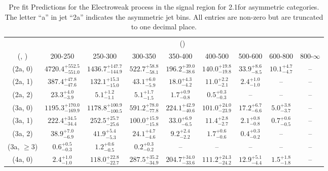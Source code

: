 \begin{table}[h!]
\tiny
\centering
\caption{Pre fit Predictions for the Electroweak process in the signal region for 2.1\ifb for asymmetric categories. The letter ``a'' in jet \eg ``2a''  indicates the asymmetric jet bins. All entries are non-zero but are truncated to one decimal place.\label{tab:predsepnaive_sig_ewk_asym}}
\begin{tabular}
{ccccccccc}
	\hline\hline
	& \multicolumn{8}{c}{\scalht (\gev)} \\ 
	 (\njet,  \nb) & 200-250 & 250-300 & 300-350 & 350-400 & 400-500 & 500-600 & 600-800 & 800-$\infty$ \\ [0.8ex] 
\hline
	(2a, 0) & $4720.4^{+ 552.5 }_{- 551.0 }$ & $1436.7^{+ 147.7 }_{- 144.9 }$ & $522.7^{+ 58.8 }_{- 58.1 }$ & $196.2^{+ 39.0 }_{- 38.6 }$ & $140.0^{+ 19.8 }_{- 19.8 }$ & $33.9^{+ 8.6 }_{- 8.5 }$ & $10.1^{+ 4.7 }_{- 4.7 }$ & -- \\[0.5ex] 
	(2a, 1) & $387.4^{+ 47.8 }_{- 47.6 }$ & $132.1^{+ 15.3 }_{- 15.0 }$ & $43.1^{+ 6.0 }_{- 5.9 }$ & $18.0^{+ 4.3 }_{- 4.2 }$ & $11.0^{+ 2.2 }_{- 2.1 }$ & $2.4^{+ 1.0 }_{- 1.0 }$ & -- & -- \\[0.5ex] 
	(2a, 2) & $23.3^{+ 4.0 }_{- 3.9 }$ & $5.1^{+ 1.2 }_{- 1.1 }$ & $5.1^{+ 1.7 }_{- 1.5 }$ & $1.7^{+ 0.9 }_{- 0.8 }$ & $0.5^{+ 0.3 }_{- 0.3 }$ & -- & -- & -- \\[0.5ex] 
	(3a, 0) & $1195.3^{+ 170.0 }_{- 169.9 }$ & $1178.8^{+ 100.9 }_{- 100.5 }$ & $591.2^{+ 78.0 }_{- 77.8 }$ & $224.1^{+ 42.9 }_{- 40.6 }$ & $101.0^{+ 24.0 }_{- 23.9 }$ & $17.2^{+ 6.7 }_{- 6.6 }$ & $5.0^{+ 3.8 }_{- 3.7 }$ & -- \\[0.5ex] 
	(3a, 1) & $222.4^{+ 34.5 }_{- 34.4 }$ & $252.5^{+ 25.7 }_{- 25.6 }$ & $100.0^{+ 15.9 }_{- 15.8 }$ & $33.0^{+ 6.9 }_{- 6.5 }$ & $11.4^{+ 2.8 }_{- 2.7 }$ & $2.1^{+ 0.8 }_{- 0.8 }$ & $0.7^{+ 0.6 }_{- 0.5 }$ & -- \\[0.5ex] 
	(3a, 2) & $38.9^{+ 7.0 }_{- 6.9 }$ & $41.9^{+ 5.4 }_{- 5.3 }$ & $24.1^{+ 4.7 }_{- 4.6 }$ & $9.2^{+ 2.4 }_{- 2.2 }$ & $1.7^{+ 0.6 }_{- 0.6 }$ & $0.4^{+ 0.3 }_{- 0.2 }$ & -- & -- \\[0.5ex] 
	(3a, $\ge3$) & $0.6^{+ 0.5 }_{- 0.3 }$ & $1.2^{+ 0.6 }_{- 0.5 }$ & $0.2^{+ 0.3 }_{- 0.2 }$ & -- & -- & -- & -- & -- \\[0.5ex] 
	(4a, 0) & $2.4^{+ 1.0 }_{- 1.0 }$ & $118.0^{+ 22.8 }_{- 22.7 }$ & $287.5^{+ 35.2 }_{- 34.9 }$ & $204.7^{+ 34.0 }_{- 33.6 }$ & $111.2^{+ 24.3 }_{- 24.2 }$ & $12.9^{+ 5.1 }_{- 4.4 }$ & $1.5^{+ 1.8 }_{- 1.8 }$ & -- \\[0.5ex] 

\end{tabular}
\end{table}
